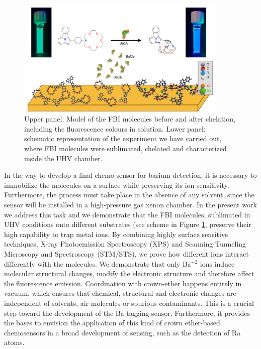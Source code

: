 \documentclass[aps,prl,reprint,longbibliography,superscriptaddress]{revtex4-1}
\def\Ba{Ba$^{+2}$ }
\begin{document}
 \begin{figure}[ht!]
	\includegraphics[width=0.9\textwidth]{figures/fig1_fbi_model.pdf}
	\caption{\label{ModeloFBI} 
    Upper panel: Model of the FBI molecules before and after chelation, including the fluorescence colours in solution. Lower panel: schematic representation of the experiment we have carried out, where FBI molecules were sublimated, chelated and characterized inside the UHV chamber.}
\end{figure}  

 In the way to develop a final chemo-sensor for barium detection, it is necessary to immobilize the molecules on a surface while preserving its ion sensitivity. Furthermore, the process must take place in the absence of any solvent, since the sensor will be installed in a high-pressure gas xenon chamber. In the present work we address this task and we demonstrate that the FBI molecules, sublimated in UHV conditions onto different substrates (see scheme in Figure \ref{ModeloFBI}, preserve their high capability to trap metal ions. By combining highly surface sensitive techniques, X-ray Photoemission Spectroscopy (XPS) and Scanning Tunneling Microscopy and Spectroscopy (STM/STS), we prove how different ions interact differently with the molecules. We demonstrate that only \Ba ions induce molecular structural changes, modify the electronic structure and therefore affect the fluorescence emission. Coordination with crown-ether happens entirely in vacuum, which ensures that chemical, structural and electronic changes are independent of solvents, air molecules or spurious contaminants. This is a crucial step toward the development of the Ba tagging sensor. Furthermore, it provides the bases to envision the application of this kind of crown ether-based chemosensors in a broad development of sensing, such as the detection of Ra atoms.
\end{document}
